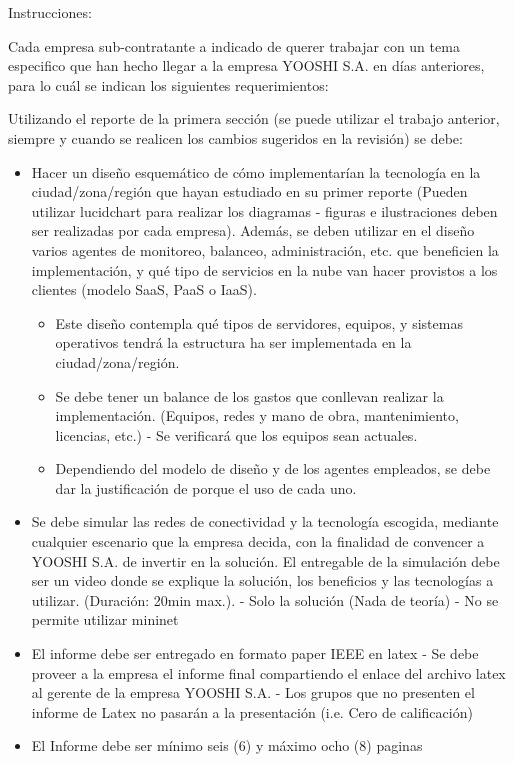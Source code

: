 Instrucciones:

Cada empresa sub-contratante a indicado de querer trabajar con un tema especifico que han hecho llegar a la empresa YOOSHI S.A. en días anteriores, para lo cuál se indican los siguientes requerimientos:

Utilizando el reporte de la primera sección (se puede utilizar el trabajo anterior, siempre y cuando se realicen los cambios sugeridos en la revisión) se debe:
\begin{itemize}
    \item Hacer un diseño esquemático de cómo implementarían la tecnología en la ciudad/zona/región que hayan estudiado en su primer reporte (Pueden utilizar lucidchart para realizar los diagramas - figuras e ilustraciones deben ser realizadas por cada empresa). Además, se deben utilizar en el diseño varios agentes de monitoreo, balanceo, administración, etc. que beneficien la implementación, y qué tipo de servicios en la nube van hacer provistos a los clientes (modelo SaaS, PaaS o IaaS).
    \begin{itemize}
        \item Este diseño contempla qué tipos de servidores, equipos, y sistemas operativos tendrá la estructura ha ser implementada en la ciudad/zona/región.
        \item Se debe tener un balance de los gastos que conllevan realizar la implementación. (Equipos, redes y mano de obra, mantenimiento, licencias, etc.) - Se verificará que los equipos sean actuales. 
        \item Dependiendo del modelo de diseño y de los agentes empleados, se debe dar la justificación de porque el uso de cada uno.
    \end{itemize}
    \item Se debe simular las redes de conectividad y la tecnología escogida, mediante cualquier escenario que la empresa decida, con la finalidad de convencer a YOOSHI S.A. de invertir en la solución. El entregable de la simulación debe ser un video donde se explique la solución, los beneficios y las tecnologías a utilizar. (Duración: 20min max.). - Solo la solución (Nada de teoría) - No se permite utilizar mininet
    \item El informe debe ser entregado en formato paper IEEE en latex - Se debe proveer a la empresa el informe final compartiendo el enlace del archivo latex al gerente de la empresa YOOSHI S.A. - Los grupos que no presenten el informe de Latex no pasarán a la presentación (i.e. Cero de calificación)
    \item El Informe debe ser mínimo seis (6) y máximo ocho (8) paginas

\end{itemize}
